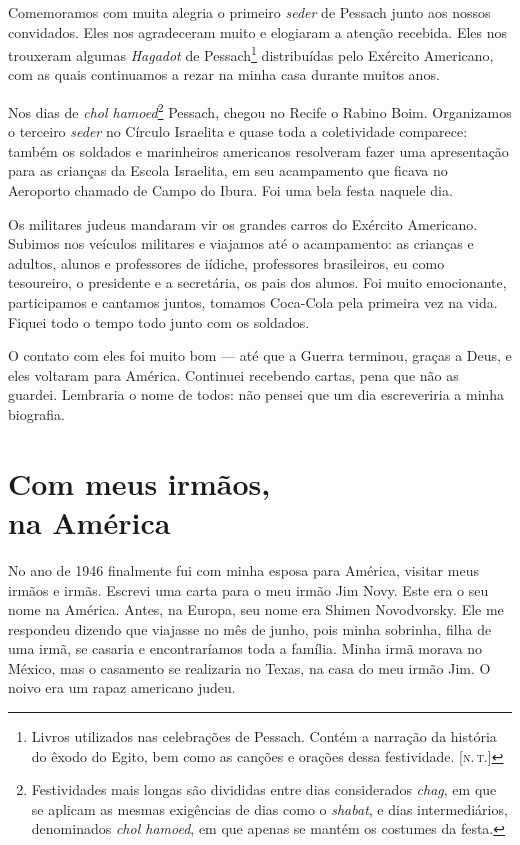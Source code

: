 Comemoramos com muita alegria o primeiro
\textit{seder} de Pessach junto aos nossos convidados. Eles nos agradeceram muito e
elogiaram a atenção recebida. Eles nos trouxeram algumas
\textit{Hagadot} de Pessach\footnote{Livros utilizados nas celebrações de
  Pessach. Contém a narração da história do êxodo do Egito, bem como
  as canções e orações dessa festividade. {[}\textsc{n.\,t.}{]}} distribuídas pelo Exército
Americano, com as quais continuamos a rezar na minha casa durante muitos anos.

Nos dias de \textit{chol hamoed}\footnote{Festividades mais longas são divididas
  entre dias considerados \textit{chag}, em que se aplicam as mesmas exigências
  de dias como o \textit{shabat}, e dias intermediários, denominados \textit{chol hamoed},
  em que apenas se mantém os costumes da festa.} Pessach, chegou no
Recife o Rabino Boim. Organizamos o terceiro \textit{seder} no Círculo
Israelita e quase toda a coletividade comparece: também os soldados e
marinheiros americanos resolveram fazer uma apresentação para as
crianças da Escola Israelita, em seu acampamento que ficava no Aeroporto
chamado de Campo do Ibura. Foi uma bela festa naquele dia. 

Os militares judeus mandaram vir os grandes carros do Exército Americano. Subimos nos veículos militares e viajamos até o acampamento: as crianças e adultos, alunos e professores de iídiche, professores brasileiros, eu como tesoureiro, o presidente e a secretária, os pais dos alunos.
Foi muito emocionante, participamos e cantamos juntos, tomamos Coca-Cola pela primeira vez na
vida. Fiquei todo o tempo todo junto com os soldados.

O contato com eles foi muito bom --- até que a Guerra terminou, graças a
Deus, e eles voltaram para América. Continuei recebendo cartas, pena
que não as guardei. Lembraria o nome de todos: não pensei que
um dia escreveriria a minha biografia.

\chapter*{Com meus irmãos,\\na América}

No ano de 1946 finalmente fui com minha esposa para América, visitar
meus irmãos e irmãs. Escrevi uma carta para o meu irmão Jim Novy. Este
era o seu nome na América. Antes, na Europa, seu nome era Shimen
Novodvorsky. Ele me respondeu dizendo que viajasse no mês de junho,
pois minha sobrinha, filha de uma irmã, se casaria e encontraríamos
toda a família. Minha irmã morava no México, mas o casamento
se realizaria no Texas, na casa do meu irmão Jim. O noivo era um rapaz
americano judeu.

